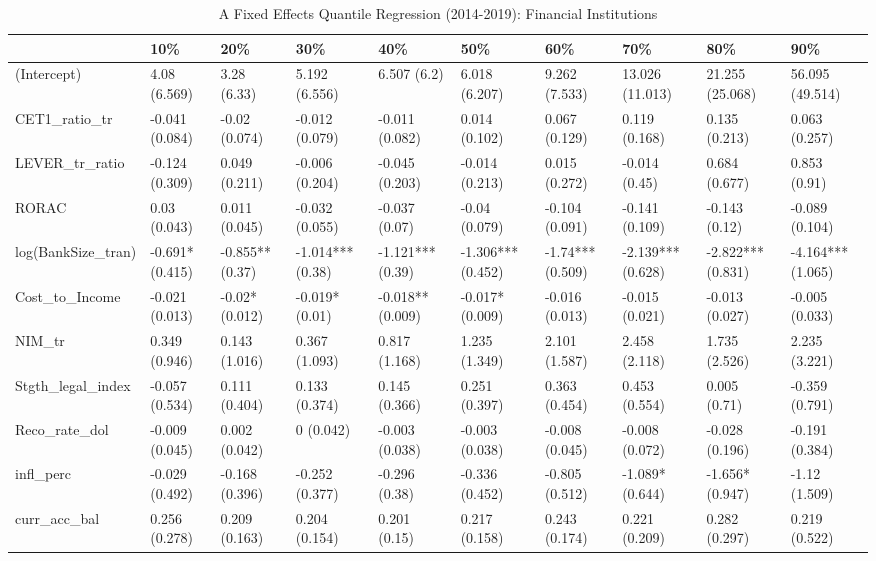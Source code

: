 \begin{table}[ht]
\centering
\caption{A Fixed Effects Quantile Regression (2014-2019): Financial Institutions} 
\begingroup\small
\begin{tabular}{llllllllll}
  \toprule
 & 10\% & 20\% & 30\% & 40\% & 50\% & 60\% & 70\% & 80\% & 90\% \\ 
  \midrule
(Intercept) & 4.08 (6.569) & 3.28 (6.33) & 5.192 (6.556) & 6.507 (6.2) & 6.018 (6.207) & 9.262 (7.533) & 13.026 (11.013) & 21.255 (25.068) & 56.095 (49.514) \\ 
  CET1\_ratio\_tr & -0.041 (0.084) & -0.02 (0.074) & -0.012 (0.079) & -0.011 (0.082) & 0.014 (0.102) & 0.067 (0.129) & 0.119 (0.168) & 0.135 (0.213) & 0.063 (0.257) \\ 
  LEVER\_tr\_ratio & -0.124 (0.309) & 0.049 (0.211) & -0.006 (0.204) & -0.045 (0.203) & -0.014 (0.213) & 0.015 (0.272) & -0.014 (0.45) & 0.684 (0.677) & 0.853 (0.91) \\ 
  RORAC & 0.03 (0.043) & 0.011 (0.045) & -0.032 (0.055) & -0.037 (0.07) & -0.04 (0.079) & -0.104 (0.091) & -0.141 (0.109) & -0.143 (0.12) & -0.089 (0.104) \\ 
  log(BankSize\_tran) & -0.691* (0.415) & -0.855** (0.37) & -1.014*** (0.38) & -1.121*** (0.39) & -1.306*** (0.452) & -1.74*** (0.509) & -2.139*** (0.628) & -2.822*** (0.831) & -4.164*** (1.065) \\ 
  Cost\_to\_Income & -0.021 (0.013) & -0.02* (0.012) & -0.019* (0.01) & -0.018** (0.009) & -0.017* (0.009) & -0.016 (0.013) & -0.015 (0.021) & -0.013 (0.027) & -0.005 (0.033) \\ 
  NIM\_tr & 0.349 (0.946) & 0.143 (1.016) & 0.367 (1.093) & 0.817 (1.168) & 1.235 (1.349) & 2.101 (1.587) & 2.458 (2.118) & 1.735 (2.526) & 2.235 (3.221) \\ 
  Stgth\_legal\_index & -0.057 (0.534) & 0.111 (0.404) & 0.133 (0.374) & 0.145 (0.366) & 0.251 (0.397) & 0.363 (0.454) & 0.453 (0.554) & 0.005 (0.71) & -0.359 (0.791) \\ 
  Reco\_rate\_dol & -0.009 (0.045) & 0.002 (0.042) & 0 (0.042) & -0.003 (0.038) & -0.003 (0.038) & -0.008 (0.045) & -0.008 (0.072) & -0.028 (0.196) & -0.191 (0.384) \\ 
  infl\_perc & -0.029 (0.492) & -0.168 (0.396) & -0.252 (0.377) & -0.296 (0.38) & -0.336 (0.452) & -0.805 (0.512) & -1.089* (0.644) & -1.656* (0.947) & -1.12 (1.509) \\ 
  curr\_acc\_bal & 0.256 (0.278) & 0.209 (0.163) & 0.204 (0.154) & 0.201 (0.15) & 0.217 (0.158) & 0.243 (0.174) & 0.221 (0.209) & 0.282 (0.297) & 0.219 (0.522) \\ 

\end{tabular}
\end{table}
